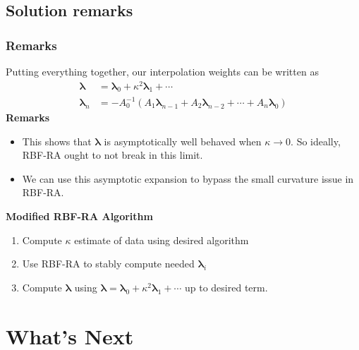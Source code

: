 \documentclass{cubeamer}
\begin{document}
\subsection{Solution remarks}

\begin{frame}
	\frametitle{Remarks}
	\begin{overprint}
		Putting everything together, our interpolation weights can be written as
		\begin{align*}
			\pmb{\lambda} &= \pmb{\lambda}_0 + \kappa^2 \pmb{\lambda}_1 + \cdots \\
			\pmb{\lambda}_n &= -A_0^{-1} (A_1\pmb{\lambda}_{n - 1} + A_2 \pmb{\lambda}_{n - 2} + \cdots + A_n \pmb{\lambda}_0)
		\end{align*}
		\onslide<2-3>
		\textbf{Remarks}
		\begin{itemize}
			\item<2-> This shows that $ \pmb{\lambda} $ is asymptotically well behaved when $ \kappa \to 0 $. So ideally, RBF-RA ought to not break in this limit.
			\item<3-> We can use this asymptotic expansion to bypass the small curvature issue in RBF-RA.
		\end{itemize}
			\textbf{Modified RBF-RA Algorithm}
			\begin{enumerate}[label = (\alph*)]
				\item Compute $ \kappa $ estimate of data using desired algorithm
				\item Use RBF-RA to stably compute needed $ \pmb{\lambda}_i $
				\item Compute $ \pmb{\lambda} $ using $ \pmb{\lambda} = \pmb{\lambda}_0 + \kappa^2 \pmb{\lambda}_1 + \cdots $ up to desired term.
			\end{enumerate}
	\end{overprint}
\end{frame}

\section{What's Next}
\end{document}
